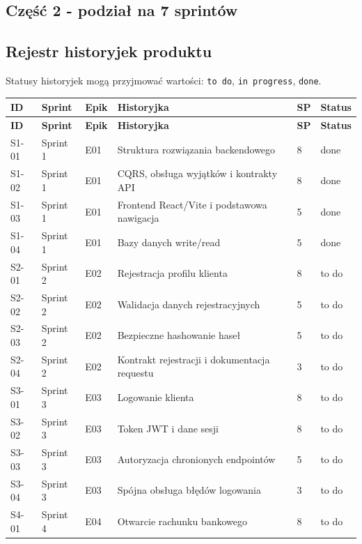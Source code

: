 \documentclass[12pt,a4paper]{article}
\begin{document}
\subsection*{Część 2 - podział na 7 sprintów}

\subsection*{Rejestr historyjek produktu}

Statusy historyjek mogą przyjmować wartości: \texttt{to do}, \texttt{in progress}, \texttt{done}.

\begingroup
\footnotesize
{}
\begin{longtable}{@{}L{0.08\textwidth}L{0.12\textwidth}L{0.10\textwidth}L{0.42\textwidth}C{0.06\textwidth}L{0.12\textwidth}@{}}
\toprule
{}
\textbf{ID} & \textbf{Sprint} & \textbf{Epik} & \textbf{Historyjka} & \textbf{SP} & \textbf{Status} \\
\midrule
\endfirsthead
\toprule
{}
\textbf{ID} & \textbf{Sprint} & \textbf{Epik} & \textbf{Historyjka} & \textbf{SP} & \textbf{Status} \\
\midrule
\endhead
S1-01 & Sprint 1 & E01 & Struktura rozwiązania backendowego & 8 & done \\
S1-02 & Sprint 1 & E01 & CQRS, obsługa wyjątków i kontrakty API & 8 & done \\
S1-03 & Sprint 1 & E01 & Frontend React/Vite i podstawowa nawigacja & 5 & done \\
S1-04 & Sprint 1 & E01 & Bazy danych write/read & 5 & done \\
S2-01 & Sprint 2 & E02 & Rejestracja profilu klienta & 8 & to do \\
S2-02 & Sprint 2 & E02 & Walidacja danych rejestracyjnych & 5 & to do \\
S2-03 & Sprint 2 & E02 & Bezpieczne hashowanie haseł & 5 & to do \\
S2-04 & Sprint 2 & E02 & Kontrakt rejestracji i dokumentacja requestu & 3 & to do \\
S3-01 & Sprint 3 & E03 & Logowanie klienta & 8 & to do \\
S3-02 & Sprint 3 & E03 & Token JWT i dane sesji & 8 & to do \\
S3-03 & Sprint 3 & E03 & Autoryzacja chronionych endpointów & 5 & to do \\
S3-04 & Sprint 3 & E03 & Spójna obsługa błędów logowania & 3 & to do \\
S4-01 & Sprint 4 & E04 & Otwarcie rachunku bankowego & 8 & to do \\

\end{longtable}
\end{document}
